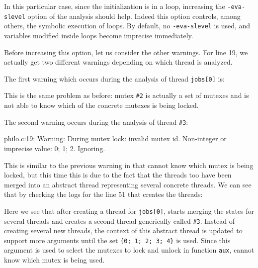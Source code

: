 \documentclass{frama-c-book}
\begin{document}
In this particular case, since the initialization is in a loop, increasing
the \verb#-eva-slevel# option of the \Eva analysis should help. Indeed this
option controls, among others, the symbolic execution of loops. By default,
no \verb#-eva-slevel# is used, and variables modified inside loops become
imprecise immediately.

Before increasing this option, let us consider the other warnings.
For line 19, we actually get two different warnings depending on which thread
is analyzed.

The first warning which occurs during the analysis of thread \verb+jobs[0]+ is:
This is the same problem as before: mutex \verb+#2+ is actually a set of mutexes
and \mthread is not able to know which of the concrete mutexes is being locked.

The second warning occurs during the analysis of thread \verb+#3+:
\begin{logs}
[eva] philo.c:19: Warning:
  During mutex lock: invalid mutex id. Non-integer or imprecise value: {0; 1; 2}. Ignoring.
\end{logs}
This is similar to the previous warning in that \mthread cannot know which mutex
is being locked, but this time this is due to the fact that the threads too have
been merged into an abstract thread representing several concrete threads. We
can see that by checking the logs for the line 51 that creates the threads:
Here we see that after creating a thread for \verb+jobs[0]+, \Eva starts merging
the states for several threads and \mthread creates a second thread generically
called \verb+#3+. Instead of creating several new threads, the context of this
abstract thread is updated to support more arguments until the set
\verb+{0; 1; 2; 3; 4}+ is used. Since this argument is used to select the
mutexes to lock and unlock in function \verb+aux+, \mthread cannot know which
mutex is being used.
\end{document}
